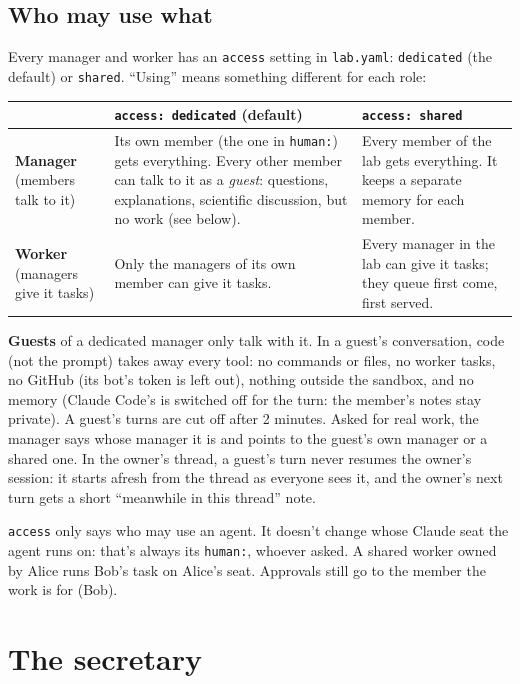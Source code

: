 \documentclass[11pt]{article}
\newcommand{\code}[1]{\texttt{#1}}
\begin{document}
\subsection{Who may use what}
Every manager and worker has an \code{access} setting in \code{lab.yaml}: \code{dedicated}
(the default) or \code{shared}. ``Using'' means something different for each role:

\medskip
\begin{tabularx}{\linewidth}{lLL}
\toprule
 & \code{access: dedicated} (default) & \code{access: shared} \\
\midrule
\textbf{Manager} (members talk to it) &
  Its own member (the one in \code{human:}) gets everything. Every other member can talk
  to it as a \emph{guest}: questions, explanations, scientific discussion, but no work
  (see below). &
  Every member of the lab gets everything. It keeps a separate memory for each member. \\
\addlinespace
\textbf{Worker} (managers give it tasks) &
  Only the managers of its own member can give it tasks. &
  Every manager in the lab can give it tasks; they queue first come, first served. \\
\bottomrule
\end{tabularx}

\medskip
\textbf{Guests} of a dedicated manager only talk with it. In a guest's conversation, code
(not the prompt) takes away every tool: no commands or files, no worker tasks, no GitHub
(its bot's token is left out), nothing outside the sandbox, and no memory (Claude Code's is
switched off for the turn: the member's notes stay private). A guest's turns are cut off after 2 minutes. Asked for real
work, the manager says whose manager it is and points to the guest's own manager or a
shared one. In the owner's thread, a guest's turn never resumes the owner's session: it
starts afresh from the thread as everyone sees it, and the owner's next turn gets a short
``meanwhile in this thread'' note.

\medskip
\code{access} only says who may use an agent. It doesn't change whose Claude seat the agent
runs on: that's always its \code{human:}, whoever asked. A shared worker owned by Alice runs
Bob's task on Alice's seat. Approvals still go to the member the work is for (Bob).

\section{The secretary}
\end{document}
